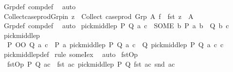\begin{isabellebody}
\ Grp{\isacharunderscore}{\kern0pt}def\ comp{\isacharunderscore}{\kern0pt}def\ \isamarkupfalse%
\ auto%
\endisatagproof
{\isafoldproof}%
%
\isadelimproof
\isanewline
%
\endisadelimproof
\isanewline
{}\isamarkupfalse%
\ Collect{\isacharunderscore}{\kern0pt}case{\isacharunderscore}{\kern0pt}prod{\isacharunderscore}{\kern0pt}Grp{\isacharunderscore}{\kern0pt}in{\isacharcolon}{\kern0pt}\ {\isachardoublequoteopen}z\ {\isasymin}\ Collect\ {\isacharparenleft}{\kern0pt}case{\isacharunderscore}{\kern0pt}prod\ {\isacharparenleft}{\kern0pt}Grp\ A\ f{\isacharparenright}{\kern0pt}{\isacharparenright}{\kern0pt}\ {\isasymLongrightarrow}\ fst\ z\ {\isasymin}\ A{\isachardoublequoteclose}\isanewline
%
\isadelimproof
\ \ %
\endisadelimproof
%
\isatagproof
{}\isamarkupfalse%
\ Grp{\isacharunderscore}{\kern0pt}def\ comp{\isacharunderscore}{\kern0pt}def\ \isamarkupfalse%
\ auto%
\endisatagproof
{\isafoldproof}%
%
\isadelimproof
\isanewline
%
\endisadelimproof
\isanewline
{}\isamarkupfalse%
\ {\isachardoublequoteopen}pick{\isacharunderscore}{\kern0pt}middlep\ P\ Q\ a\ c\ {\isacharequal}{\kern0pt}\ {\isacharparenleft}{\kern0pt}SOME\ b{\isachardot}{\kern0pt}\ P\ a\ b\ {\isasymand}\ Q\ b\ c{\isacharparenright}{\kern0pt}{\isachardoublequoteclose}\isanewline
\isanewline
{}\isamarkupfalse%
\ pick{\isacharunderscore}{\kern0pt}middlep{\isacharcolon}{\kern0pt}\isanewline
\ \ {\isachardoublequoteopen}{\isacharparenleft}{\kern0pt}P\ OO\ Q{\isacharparenright}{\kern0pt}\ a\ c\ {\isasymLongrightarrow}\ P\ a\ {\isacharparenleft}{\kern0pt}pick{\isacharunderscore}{\kern0pt}middlep\ P\ Q\ a\ c{\isacharparenright}{\kern0pt}\ {\isasymand}\ Q\ {\isacharparenleft}{\kern0pt}pick{\isacharunderscore}{\kern0pt}middlep\ P\ Q\ a\ c{\isacharparenright}{\kern0pt}\ c{\isachardoublequoteclose}\isanewline
%
\isadelimproof
\ \ %
\endisadelimproof
%
\isatagproof
{}\isamarkupfalse%
\ pick{\isacharunderscore}{\kern0pt}middlep{\isacharunderscore}{\kern0pt}def\ \isamarkupfalse%
{\isacharparenleft}{\kern0pt}rule\ someI{\isacharunderscore}{\kern0pt}ex{\isacharparenright}{\kern0pt}\ \isamarkupfalse%
\ auto%
\endisatagproof
{\isafoldproof}%
%
\isadelimproof
\isanewline
%
\endisadelimproof
\isanewline
{}\isamarkupfalse%
\ fstOp\ \isanewline
\ \ {\isachardoublequoteopen}fstOp\ P\ Q\ ac\ {\isacharequal}{\kern0pt}\ {\isacharparenleft}{\kern0pt}fst\ ac{\isacharcomma}{\kern0pt}\ pick{\isacharunderscore}{\kern0pt}middlep\ P\ Q\ {\isacharparenleft}{\kern0pt}fst\ ac{\isacharparenright}{\kern0pt}\ {\isacharparenleft}{\kern0pt}snd\ ac{\isacharparenright}{\kern0pt}{\isacharparenright}{\kern0pt}{\isachardoublequoteclose}\isanewline

\end{isabellebody}
